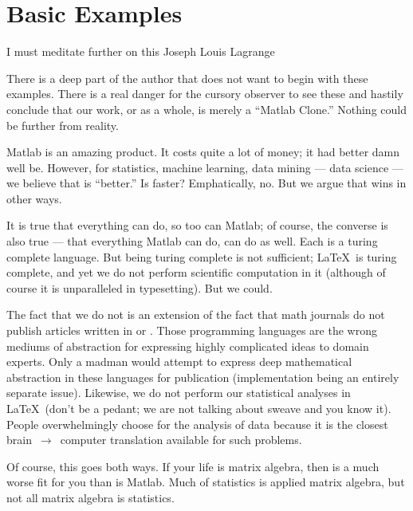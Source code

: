 
\chapter{Basic Examples}
\label{chap:basicdmat}

\inspire%
{I must meditate further on this}%
{Joseph Louis Lagrange}
\vspace{0.5cm}


There is a deep part of the author that does not want to begin with these examples.  There is a real danger for the cursory observer to see these and hastily conclude that our work, or  as a whole, is merely a ``Matlab Clone.''  Nothing could be further from reality.

Matlab is an amazing product.  It costs quite a lot of money; it had better damn well be.  However, for statistics, machine learning, data mining --- data science --- we believe that  is ``better.''  Is  faster?  Emphatically, no.  But we argue that  wins in other ways.

It is true that everything  can do, so too can Matlab; of course, the converse is also true --- that everything Matlab can do,  can do as well.  Each is a turing complete language.  But being turing complete is not sufficient; \LaTeX\ is turing complete, and yet we do not perform scientific computation in it (although of course it is unparalleled in typesetting).  But we could.  

The fact that we do not is an extension of the fact that math journals do not publish articles written in  or .  Those programming languages are the wrong mediums of abstraction for expressing highly complicated ideas to domain experts.  Only a madman would attempt to express deep mathematical abstraction in these languages for publication (implementation being an entirely separate issue).  Likewise, we do not perform our statistical analyses in \LaTeX\ (don't be a pedant; we are not talking about sweave and you know it).  People overwhelmingly choose  for the analysis of data because it is the closest brain~$\rightarrow$~computer translation available for such problems.

Of course, this goes both ways.  If your life is matrix algebra, then  is a much worse fit for you than is Matlab.  Much of statistics is applied matrix algebra, but not all matrix algebra is statistics.

